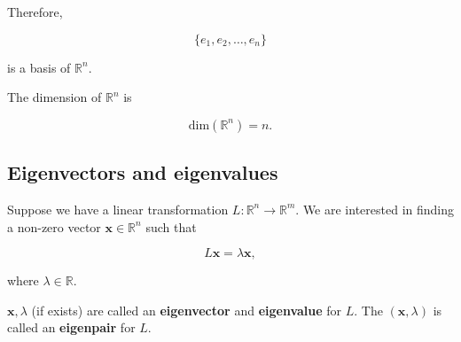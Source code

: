 Therefore,

\begin{equation}
	\{e_1,e_2,\dots,e_n\}
	\label{eq:basis-and-dimension-of-r-26}
\end{equation}

is a basis of \(\mathbb{R}^n\).

\begin{theorem}
	The dimension of \(\mathbb{R}^n\) is

	\begin{equation}
		\mathrm{dim}(\mathbb{R}^n)=n.
		\label{eq:basis-and-dimension-of-r-27}
	\end{equation}

\end{theorem}

\subsection{Eigenvectors and eigenvalues}
Suppose we have a linear transformation \( L: \mathbb{R}^n \to \mathbb{R}^m \). We are interested in finding a non-zero vector \( \mathbf{x} \in \mathbb{R}^n \) such that

\begin{equation}
	L \mathbf{x} = \lambda \mathbf{x},
	\label{eq:eigenvectors-and-eigenvalues-1}
\end{equation}

where \( \lambda \in \mathbb{R} \).
\begin{definition}
	\(\mathbf{x}, \lambda \) (if exists) are called an \textbf{eigenvector} and \textbf{eigenvalue} for \( L \). The \( (\mathbf{x}, \lambda) \) is called an \textbf{eigenpair} for \( L \).
\end{definition}

